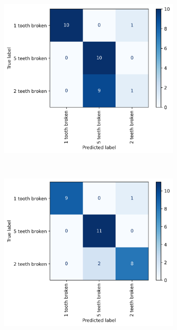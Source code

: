 \documentclass[energies,article,submit,pdftex,moreauthors]{Definitions/mdpi}
\begin{document}
\begin{figure}[t!]
    ~ 
    \begin{subfigure}[t]{0.3\textwidth}
        \centering
        \includegraphics[width=\linewidth]{images/confusion_matrix_multiclass_3}
        \caption{}
    \end{subfigure}
    ~ 
    \begin{subfigure}[t]{0.3\textwidth}
        \centering
        \includegraphics[width=\linewidth]{images/confusion_matrix_multiclass_4}

\end{subfigure}
\end{figure}
\end{document}
